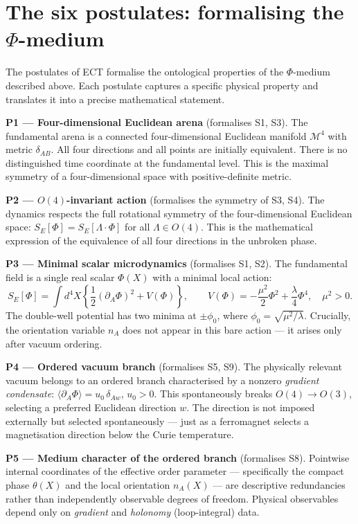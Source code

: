 \documentclass[11pt,a4paper]{article}
\begin{document}
\section{The six postulates: formalising the $\Phi$-medium}
\label{sec:pop_postulates}

The postulates of ECT formalise the ontological properties of the $\Phi$-medium described above. Each postulate captures a specific physical property and translates it into a precise mathematical statement.

\textbf{P1 --- Four-dimensional Euclidean arena} (formalises S1, S3).
The fundamental arena is a connected four-dimensional Euclidean manifold $\mathcal{M}^4$ with metric $\delta_{AB}$. All four directions and all points are initially equivalent. There is no distinguished time coordinate at the fundamental level. This is the maximal symmetry of a four-dimensional space with positive-definite metric.

\textbf{P2 --- $O(4)$-invariant action} (formalises the symmetry of S3, S4).
The dynamics respects the full rotational symmetry of the four-dimensional Euclidean space: $S_E[\Phi] = S_E[\Lambda \cdot \Phi]$ for all $\Lambda \in O(4)$. This is the mathematical expression of the equivalence of all four directions in the unbroken phase.

\textbf{P3 --- Minimal scalar microdynamics} (formalises S1, S2).
The fundamental field is a single real scalar $\Phi(X)$ with a minimal local action:
\begin{equation}
  S_E[\Phi] = \int d^4X\left\{
  \frac{1}{2}(\partial_A\Phi)^2 + V(\Phi)\right\},
  \qquad
  V(\Phi) = -\frac{\mu^2}{2}\Phi^2 + \frac{\lambda}{4}\Phi^4,
  \quad \mu^2 > 0.
  \label{eq:pop_action}
\end{equation}
The double-well potential has two minima at $\pm\phi_0$, where $\phi_0 = \sqrt{\mu^2/\lambda}$. Crucially, the orientation variable $n_A$ does not appear in this bare action --- it arises only after vacuum ordering.

\textbf{P4 --- Ordered vacuum branch} (formalises S5, S9).
The physically relevant vacuum belongs to an ordered branch characterised by a nonzero \emph{gradient condensate}: $\langle\partial_A\Phi\rangle = u_0\,\delta_{Aw}$, $u_0 > 0$. This spontaneously breaks $O(4) \to O(3)$, selecting a preferred Euclidean direction $w$. The direction is not imposed externally but selected spontaneously --- just as a ferromagnet selects a magnetisation direction below the Curie temperature.

\textbf{P5 --- Medium character of the ordered branch} (formalises S8).
Pointwise internal coordinates of the effective order parameter --- specifically the compact phase $\theta(X)$ and the local orientation $n_A(X)$ --- are descriptive redundancies rather than independently observable degrees of freedom. Physical observables depend only on \emph{gradient} and \emph{holonomy} (loop-integral) data.
\end{document}
